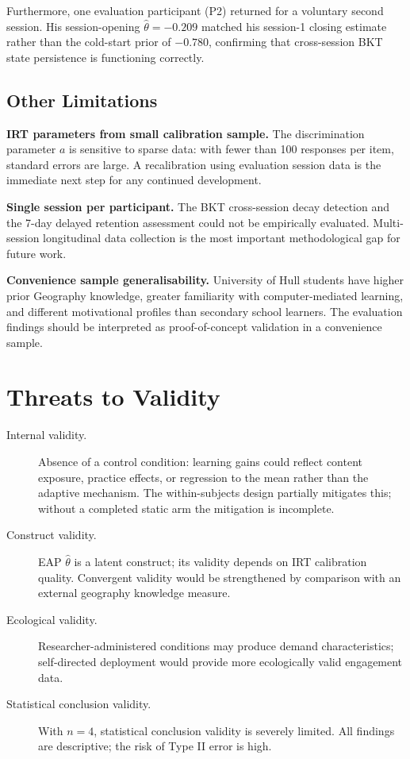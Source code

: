 Furthermore, one evaluation participant (P2) returned for a voluntary second
session. His session-opening $\hat{\theta} = -0.209$ matched his session-1
closing estimate rather than the cold-start prior of $-0.780$, confirming that
cross-session BKT state persistence is functioning correctly.

\subsection{Other Limitations}

\textbf{IRT parameters from small calibration sample.} The discrimination
parameter $a$ is sensitive to sparse data: with fewer than 100 responses per
item, standard errors are large. A recalibration using evaluation session data
is the immediate next step for any continued development.

\textbf{Single session per participant.} The BKT cross-session decay detection
and the 7-day delayed retention assessment could not be empirically evaluated.
Multi-session longitudinal data collection is the most important methodological
gap for future work.

\textbf{Convenience sample generalisability.} University of Hull students
have higher prior Geography knowledge, greater familiarity with
computer-mediated learning, and different motivational profiles than secondary
school learners. The evaluation findings should be interpreted as
proof-of-concept validation in a convenience sample.

\section{Threats to Validity}
\label{sec:disc_threats}

\begin{description}
  \item[Internal validity.] Absence of a control condition: learning gains
    could reflect content exposure, practice effects, or regression to the mean
    rather than the adaptive mechanism. The within-subjects design partially
    mitigates this; without a completed static arm the mitigation is incomplete.
  \item[Construct validity.] EAP $\hat{\theta}$ is a latent construct; its
    validity depends on IRT calibration quality. Convergent validity would be
    strengthened by comparison with an external geography knowledge measure.
  \item[Ecological validity.] Researcher-administered conditions may produce
    demand characteristics; self-directed deployment would provide more
    ecologically valid engagement data.
  \item[Statistical conclusion validity.] With $n = 4$, statistical conclusion
    validity is severely limited. All findings are descriptive; the risk of
    Type II error is high.
\end{description}

